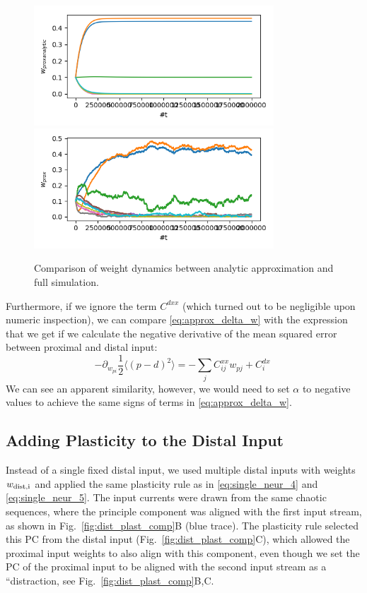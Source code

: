 \documentclass[10pt,a4paper]{article}
\newcommand{\avg}[1]{\langle #1 \rangle}
\begin{document}
\begin{figure}
\centering
\includegraphics[width=0.8\textwidth]{./figures/weights_analytic_comp.png}
\includegraphics[width=0.8\textwidth]{./figures/weights_full_sim_comp.png}
\caption{Comparison of weight dynamics between analytic approximation and full simulation.}
\label{fig:weight_dyn_analytic_comp}
\end{figure}

Furthermore, if we ignore the term $C^{dxx}$ (which turned out to be negligible upon numeric inspection), we can compare \eqref{eq:approx_delta_w} with the expression that we get if we calculate the negative derivative of the mean squared error between proximal and distal input:
\begin{equation}
-\partial_{w_{pi}} \frac{1}{2}\avg{\left( p - d \right)^2} = -\sum_j C^{xx}_{ij} w_{pj} + C^{dx}_i \;
\end{equation} 
We can see an apparent similarity, however, we would need to set $\alpha$ to negative values to achieve the same signs of terms in \eqref{eq:approx_delta_w}.

\subsection{Adding Plasticity to the Distal Input}

Instead of a single fixed distal input, we used multiple distal inputs with weights $w_{\rm dist, i}$ and applied the same plasticity rule as in \eqref{eq:single_neur_4} and \eqref{eq:single_neur_5}. The input currents were drawn from the same chaotic sequences, where the principle component was aligned with the first input stream, as shown in Fig.~\ref{fig:dist_plast_comp}B (blue trace). The plasticity rule selected this PC from the distal input (Fig.~\ref{fig:dist_plast_comp}C), which allowed the proximal input weights to also align with this component, even though we set the PC of the proximal input to be aligned with the second input stream as a ``distraction, see Fig.~\ref{fig:dist_plast_comp}B,C.
\end{document}
